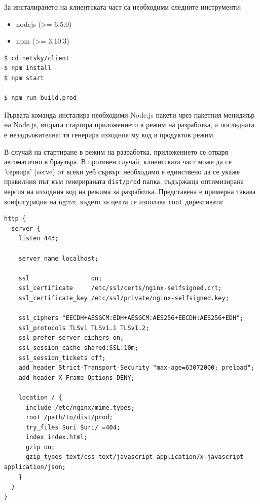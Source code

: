 \documentclass[12pt,a4paper,oneside]{book}
\begin{document}
За инсталирането на клиентската част са необходими следните инструменти:

\begin{itemize}
  \item
    nodejs (>= 6.5.0)
  \item
    npm (>= 3.10.3)
\end{itemize}

\begin{lstlisting}[language=bash,caption=Компилиране и стартиране на клиентската част]
$ cd netsky/client
$ npm install
$ npm start

$ npm run build.prod
\end{lstlisting}

Първата команда инсталира необходими Node.js пакети чрез пакетния мениджър на
Node.js, втората стартира
приложението в режим на разработка, а последната е незадължителна: тя генерира
изходния му код в продуктов режим.

В случай на стартиране в режим на разработка, приложението се отваря автоматично в
браузъра. В противен случай, клиентската част може да се 'сервира' (serve)
от всеки уеб сървър: необходимо е единствено да се укаже правилния път към
генерираната \texttt{dist/prod} папка, съдържаща оптимизирана версия
на изходния код на режима за разработка.
Представена е примерна такава конфигурация на nginx, където за целта се използва
\texttt{root} директивата:

\begin{lstlisting}[caption=Примерна конфигурация за nginx: \texttt{/etc/nginx/nginx.conf}]
http {
  server {
    listen 443;

    server_name localhost;

    ssl                 on;
    ssl_certificate     /etc/ssl/certs/nginx-selfsigned.crt;
    ssl_certificate_key /etc/ssl/private/nginx-selfsigned.key;

    ssl_ciphers "EECDH+AESGCM:EDH+AESGCM:AES256+EECDH:AES256+EDH";
    ssl_protocols TLSv1 TLSv1.1 TLSv1.2;
    ssl_prefer_server_ciphers on;
    ssl_session_cache shared:SSL:10m;
    ssl_session_tickets off;
    add_header Strict-Transport-Security "max-age=63072000; preload";
    add_header X-Frame-Options DENY;

    location / {
      include /etc/nginx/mime.types;
      root /path/to/dist/prod;
      try_files $uri $uri/ =404;
      index index.html;
      gzip on;
      gzip_types text/css text/javascript application/x-javascript application/json;
    }
  }
}
\end{lstlisting}
\end{document}
